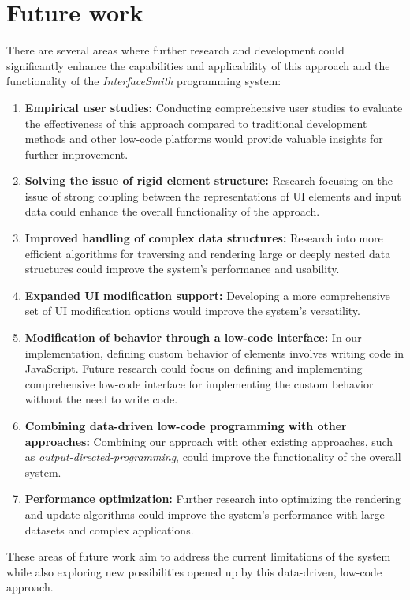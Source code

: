 \section{Future work}
There are several areas where further research and development could significantly enhance the capabilities and applicability of this approach and the functionality of the \emph{InterfaceSmith} programming system:
\begin{enumerate}
	\item \textbf{Empirical user studies:} Conducting comprehensive user studies to evaluate the effectiveness of this approach compared to traditional development methods and other low-code platforms would provide valuable insights for further improvement.
	\item \textbf{Solving the issue of rigid element structure:} Research focusing on the issue of strong coupling between the representations of UI elements and input data could enhance the overall functionality of the approach.
	\item \textbf{Improved handling of complex data structures:} Research into more efficient algorithms for traversing and rendering large or deeply nested data structures could improve the system's performance and usability.
	\item \textbf{Expanded UI modification support:} Developing a more comprehensive set of UI modification options would improve the system's versatility.
	\item \textbf{Modification of behavior through a low-code interface:} In our implementation, defining custom behavior of elements involves writing code in JavaScript.
	      Future research could focus on defining and implementing comprehensive low-code interface for implementing the custom behavior without the need to write code.
	\item \textbf{Combining data-driven low-code programming with other approaches:} Combining our approach with other existing approaches, such as \emph{output-directed-programming}\cite{output-directed-programming}, could improve the functionality of the overall system.
	\item \textbf{Performance optimization:} Further research into optimizing the rendering and update algorithms could improve the system's performance with large datasets and complex applications.
\end{enumerate}
These areas of future work aim to address the current limitations of the system while also exploring new possibilities opened up by this data-driven, low-code approach.

